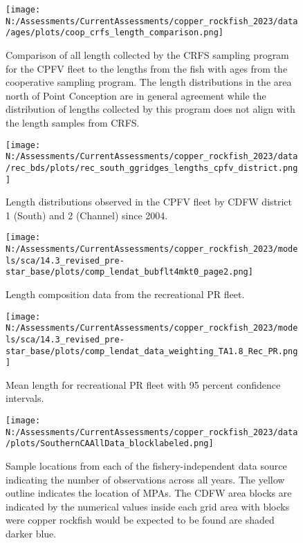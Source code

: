 \documentclass[11pt,
  english,
  letterpaper,
]{article}
\begin{document}
\pagebreak

\begin{figure}
\centering
\texttt{[image: N:/Assessments/CurrentAssessments/copper\_rockfish\_2023/data/ages/plots/coop\_crfs\_length\_comparison.png]}
\caption{Comparison of all length collected by the CRFS sampling program for the CPFV fleet to the lengths from the fish with ages from the cooperative sampling program. The length distributions in the area north of Point Conception are in general agreement while the distribution of lengths collected by this program does not align with the length samples from CRFS.\label{fig:coop-len-comparison}}
\end{figure}

\pagebreak

\begin{figure}
\centering
\texttt{[image: N:/Assessments/CurrentAssessments/copper\_rockfish\_2023/data/rec\_bds/plots/rec\_south\_ggridges\_lengths\_cpfv\_district.png]}
\caption{Length distributions observed in the CPFV fleet by CDFW district 1 (South) and 2 (Channel) since 2004.\label{fig:rec-cpfv-dist}}
\end{figure}

\pagebreak

\begin{figure}
\centering
\texttt{[image: N:/Assessments/CurrentAssessments/copper\_rockfish\_2023/models/sca/14.3\_revised\_pre-star\_base/plots/comp\_lendat\_bubflt4mkt0\_page2.png]}
\caption{Length composition data from the recreational PR fleet.\label{fig:rec-pr-len-data}}
\end{figure}

\pagebreak

\begin{figure}
\centering
\texttt{[image: N:/Assessments/CurrentAssessments/copper\_rockfish\_2023/models/sca/14.3\_revised\_pre-star\_base/plots/comp\_lendat\_data\_weighting\_TA1.8\_Rec\_PR.png]}
\caption{Mean length for recreational PR fleet with 95 percent confidence intervals.\label{fig:mean-rec-pr-len-data}}
\end{figure}

\pagebreak

\begin{figure}
\centering
\texttt{[image: N:/Assessments/CurrentAssessments/copper\_rockfish\_2023/data/plots/SouthernCAAllData\_blocklabeled.png]}
\caption{Sample locations from each of the fishery-independent data source indicating the number of observations across all years. The yellow outline indicates the location of MPAs. The CDFW area blocks are indicated by the numerical values inside each grid area with blocks were copper rockfish would be expected to be found are shaded darker blue.\label{fig:survey-locations}}
\end{figure}
\end{document}
